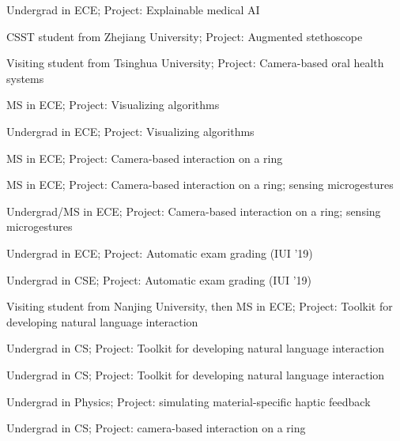  {
	 {
		Undergrad in ECE; Project: Explainable medical AI
	}
}

 {
	 {
		CSST student from Zhejiang University; Project: Augmented stethoscope
	}
}

 {
	 {
		Visiting student from Tsinghua University; Project: Camera-based oral health systems
	}
}

 {
	 {
		MS in ECE; Project: Visualizing algorithms
	}
}

 {
	 {
		Undergrad in ECE; Project: Visualizing algorithms
	}
}

 {
	 {
		MS in ECE;
		Project: Camera-based interaction on a ring
	}
}

 {
	 {
		MS in ECE;
		Project: Camera-based interaction on a ring; sensing microgestures
	}
}

 {
	 {
		Undergrad/MS in ECE;
		Project: Camera-based interaction on a ring; sensing microgestures
	}
}

 {
	 {
		Undergrad in ECE;
		Project: Automatic exam grading (IUI '19)
	}
}

 {
	 {
		Undergrad in CSE;
		Project: Automatic exam grading (IUI '19)
	}
}

 {
	 {
		Visiting student from Nanjing University, then MS in ECE;
		Project: Toolkit for developing natural language interaction
	}
}

 {
	 {
		Undergrad in CS;
		Project: Toolkit for developing natural language interaction
	}
}

 {
	 {
		Undergrad in CS;
		Project: Toolkit for developing natural language interaction
	}
}

 {
	 {
		Undergrad in Physics;
		Project: simulating material-specific haptic feedback
	}
}

 {
	 {
		Undergrad in CS;
		Project: camera-based interaction on a ring
	}
}


